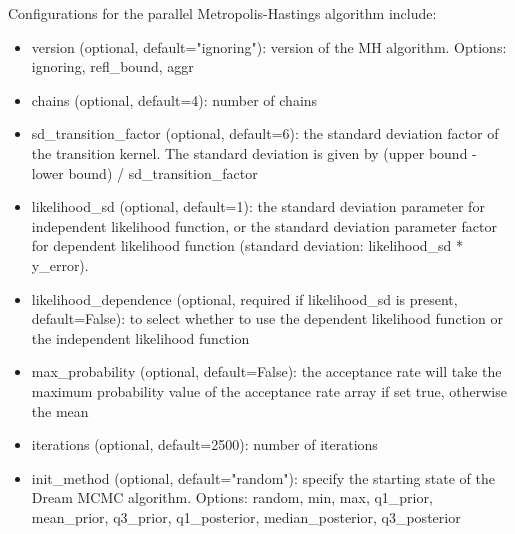 Configurations for the parallel Metropolis-Hastings algorithm include:
\begin{itemize}
    \item version (optional, default="ignoring"): version of the MH algorithm. Options: ignoring, refl\_bound, aggr
    \item chains (optional, default=4): number of chains
    \item sd\_transition\_factor (optional, default=6): the
    standard deviation factor of the transition kernel. The standard deviation is given by (upper bound - lower bound) / sd\_transition\_factor
    \item likelihood\_sd (optional, default=1): the standard deviation parameter for independent likelihood function, or the standard deviation parameter factor for dependent likelihood function (standard deviation: likelihood\_sd * y\_error).
    \item likelihood\_dependence (optional, required if likelihood\_sd is present, default=False): to select whether to use the dependent likelihood function or the independent likelihood function
    \item max\_probability (optional, default=False): the acceptance rate will take the maximum probability value of the acceptance rate array if set true, otherwise the mean
    \item iterations (optional, default=2500): number of iterations
    \item init\_method (optional, default="random"): specify the starting state of the Dream MCMC algorithm. Options: random, min, max, q1\_prior, mean\_prior, q3\_prior, q1\_posterior, median\_posterior, q3\_posterior
\end{itemize}

